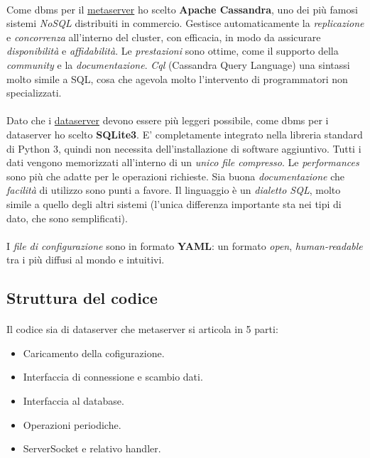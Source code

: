 \documentclass[11pt,a4paper,english]{article}
\begin{document}
\paragraph{} Come dbms per il \underline{metaserver} ho scelto \textbf{Apache Cassandra}, uno dei più famosi sistemi \emph{NoSQL} distribuiti in commercio. Gestisce automaticamente la \emph{replicazione} e \emph{concorrenza} all'interno del cluster, con efficacia, in modo da assicurare \emph{disponibilità} e \emph{affidabilità}. Le \emph{prestazioni} sono ottime, come il supporto della \emph{community} e la \emph{documentazione}. \emph{Cql} (Cassandra Query Language) una sintassi molto simile a SQL, cosa che agevola molto l'intervento di programmatori non specializzati.  

\paragraph{} Dato che i \underline{dataserver} devono essere più leggeri possibile, come dbms per i dataserver ho scelto \textbf{SQLite3}. E' completamente integrato nella libreria standard di Python 3, quindi non necessita dell'installazione di software aggiuntivo. Tutti i dati vengono memorizzati all'interno di un \emph{unico file compresso}. Le \emph{performances} sono più che adatte per le operazioni richieste. Sia buona \emph{documentazione} che \emph{facilità} di utilizzo sono punti a favore. Il linguaggio è un \emph{dialetto SQL}, molto simile a quello degli altri sistemi (l'unica differenza importante sta nei tipi di dato, che sono semplificati).  

\paragraph{} I \emph{file di configurazione} sono in formato \textbf{YAML}: un formato \emph{open}, \emph{human-readable} tra i più diffusi al mondo e intuitivi. 


\subsection{Struttura del codice}

\paragraph{} Il codice sia di dataserver che metaserver si articola in 5 parti:\begin{itemize}
	\item Caricamento della cofigurazione.
	\item Interfaccia di connessione e scambio dati.
	\item Interfaccia al database.
	\item Operazioni periodiche.
	\item ServerSocket e relativo handler.
\end{itemize}
\end{document}
